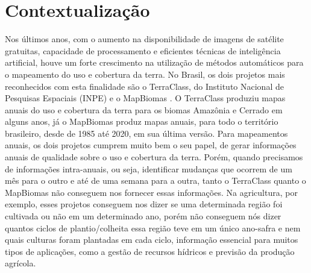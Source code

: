 \chapter{Contextualização}

Nos últimos anos, com o aumento na disponibilidade de imagens de satélite gratuitas, capacidade de processamento e eficientes técnicas de inteligência artificial, houve um forte crescimento na utilização de métodos automáticos para o mapeamento do uso e cobertura da terra. No Brasil, os dois projetos mais reconhecidos com esta finalidade são o TerraClass, do Instituto Nacional de Pesquisas Espaciais (INPE) \cite{coutinho2013uso} e o MapBiomas \cite{souza2020reconstructing}. O TerraClass produziu mapas anuais do uso e cobertura da terra para os biomas Amazônia e Cerrado em alguns anos, já o MapBiomas produz mapas anuais, para todo o território brasileiro, desde de 1985 até 2020, em sua última versão. Para mapeamentos anuais, os dois projetos cumprem muito bem o seu papel, de gerar informações anuais de qualidade sobre o uso e cobertura da terra. Porém, quando precisamos de informações intra-anuais, ou seja, identificar mudanças que ocorrem de um mês para o outro e até de uma semana para a outra, tanto o TerraClass quanto o MapBiomas não conseguem nos fornecer essas informações. Na agricultura, por exemplo, esses projetos conseguem nos dizer se uma determinada região foi cultivada ou não em um determinado ano, porém não conseguem nós dizer quantos ciclos de plantio/colheita essa região teve em um único ano-safra e nem quais culturas foram plantadas em cada ciclo, informação essencial para muitos tipos de aplicações, como a gestão de recursos hídricos e previsão da produção agrícola. 

\renewcommand{\cleardoublepage}{}
\renewcommand{\clearpage}{}
\vspace{5mm}